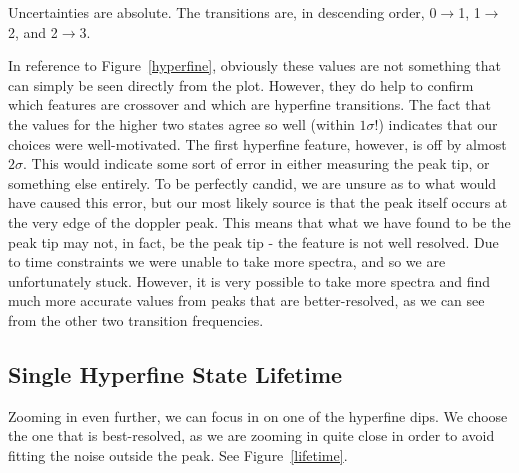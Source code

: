 \documentclass{article}
\begin{document}
  \begin{table}[!htb]
  	\centering
    \caption{Uncertainties are absolute.  The transitions are, in descending order, 0$\rightarrow$1, 1$\rightarrow$2, and 2$\rightarrow$3.}
    \label{hyperfine_splitting}
  \end{table}

  In reference to Figure~\ref{hyperfine}, obviously these values are not something that can simply be seen directly from the plot.  However, they do help to confirm which features are crossover and which are hyperfine transitions.  The fact that the values for the higher two states agree so well (within $1\sigma$!) indicates that our choices were well-motivated.  The first hyperfine feature, however, is off by almost $2\sigma$.  This would indicate some sort of error in either measuring the peak tip, or something else entirely.  To be perfectly candid, we are unsure as to what would have caused this error, but our most likely source is that the peak itself occurs at the very edge of the doppler peak.  This means that what we have found to be the peak tip may not, in fact, be the peak tip - the feature is not well resolved.  Due to time constraints we were unable to take more spectra, and so we are unfortunately stuck.  However, it is very possible to take more spectra and find much more accurate values from peaks that are better-resolved, as we can see from the other two transition frequencies.

  \subsection{Single Hyperfine State Lifetime}
  Zooming in even further, we can focus in on one of the hyperfine dips.  We choose the one that is best-resolved, as we are zooming in quite close in order to avoid fitting the noise outside the peak.  See Figure~\ref{lifetime}.
\end{document}
